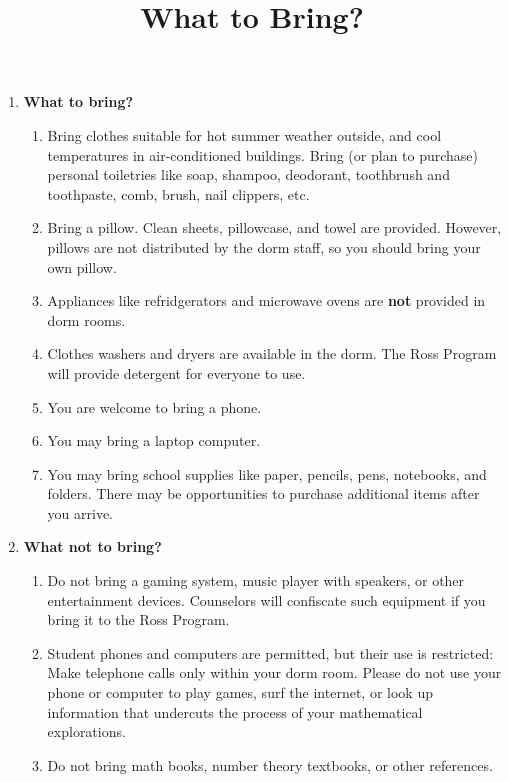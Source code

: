 \documentclass[11pt]{ross}
\title{What to Bring?}
\begin{document}
\maketitle
 \begin{enumerate}[label=(\arabic*),itemsep=2em,topsep=-1em]

\item \textbf{What to bring?}
 \begin{enumerate}[label=(\alph*),itemsep=0.5em,topsep=0em]
 \item Bring clothes suitable for hot summer weather outside, and cool
   temperatures in air-conditioned buildings.  Bring (or plan to
   purchase) personal toiletries like soap, shampoo, deodorant,
   toothbrush and toothpaste, comb, brush, nail clippers, etc.
 \item Bring a pillow.  Clean sheets, pillowcase, and towel are
   provided.  However, pillows are not distributed by the dorm
   staff, so you should bring your own pillow.
 \item Appliances like refridgerators and microwave ovens are \textbf{not} provided in dorm rooms.
 \item Clothes washers and dryers are available in the dorm.  The Ross
    Program will provide detergent for everyone to use.
  \item You are welcome to bring a phone.
  \item You may bring a laptop computer.
 \item  You may bring school supplies like paper, 
   pencils, pens, notebooks, and folders. There may be opportunities 
   to purchase additional items after you arrive.
\end{enumerate}
\item \textbf{What not to bring?}
  \begin{enumerate}[label=(\alph*),itemsep=0.5em,topsep=0em]
  \item Do not bring a gaming system, music player with speakers, 
    or other entertainment devices.  
    Counselors will confiscate such equipment if you bring it to the
    Ross Program.
  \item Student phones and computers are permitted, but their use is
    restricted: Make telephone calls only within your dorm room.
    Please do not use your phone or computer to play games, surf the internet, or
    look up information that undercuts the process of your
    mathematical explorations.
  \item Do not bring math books, number theory textbooks, or other references.  

\end{enumerate}
\end{enumerate}
\end{document}
